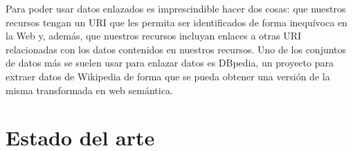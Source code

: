 \bigskip
Para poder usar datos enlazados es imprescindible hacer dos cosas: que nuestros recursos tengan un URI que les permita ser identificados de forma inequívoca en la Web y, además, que nuestros recursos incluyan enlaces a otras URI relacionadas con los datos contenidos en nuestros recursos. Uno de los conjuntos de datos más se suelen usar para enlazar datos es DBpedia, un proyecto para extraer datos de Wikipedia de forma que se pueda obtener una versión de la misma transformada en web semántica.

\section{Estado del arte}
